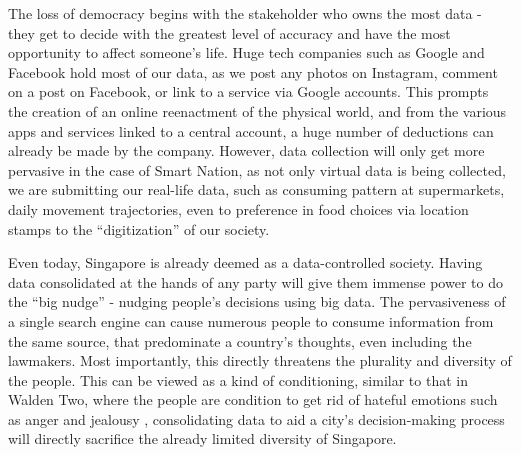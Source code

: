 \documentclass[11pt]{article}
\begin{document}
The loss of democracy begins with the stakeholder who owns the most data - they
get to decide with the greatest level of accuracy and have the most opportunity
to affect someone's life. Huge tech companies such as Google and Facebook hold
most of our data, as we post any photos on Instagram, comment on a post on
Facebook, or link to a service via Google accounts. This prompts the creation of
an online reenactment of the physical world, and from the various apps and services
linked to a central account, a huge number of deductions can already be made by
the company. However, data collection will only get more pervasive in the case
of Smart Nation, as not only virtual data is being collected, we are submitting
our real-life data, such as consuming pattern at supermarkets, daily movement
trajectories, even to preference in food choices via location stamps to the
``digitization'' of our society.

Even today, Singapore is already deemed as a data-controlled society.
\cite{Helbing2019} Having data consolidated at the hands of any party will give
them immense power to do the ``big nudge'' - nudging people's decisions using big
data. The pervasiveness of a single search engine can cause numerous people to
consume information from the same source, that predominate a country's thoughts,
even including the lawmakers. Most importantly, this directly threatens the
plurality and diversity of the people. This can be viewed as a kind of
conditioning, similar to that in Walden Two, where the people are condition to
get rid of hateful emotions such as anger and jealousy \cite{walden_two},
consolidating data to aid a city's decision-making process will directly
sacrifice the already limited diversity of Singapore.
\end{document}
